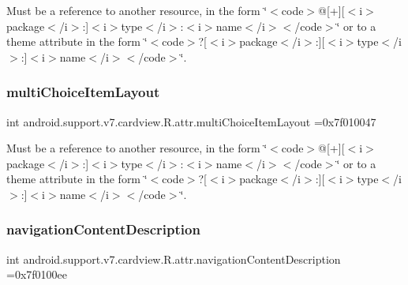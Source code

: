 Must be a reference to another resource, in the form \char`\"{}$<$code$>$@\mbox{[}+\mbox{]}\mbox{[}$<$i$>$package$<$/i$>$\+:\mbox{]}$<$i$>$type$<$/i$>$\+:$<$i$>$name$<$/i$>$$<$/code$>$\char`\"{} or to a theme attribute in the form \char`\"{}$<$code$>$?\mbox{[}$<$i$>$package$<$/i$>$\+:\mbox{]}\mbox{[}$<$i$>$type$<$/i$>$\+:\mbox{]}$<$i$>$name$<$/i$>$$<$/code$>$\char`\"{}. \mbox{\label{classandroid_1_1support_1_1v7_1_1cardview_1_1R_1_1attr_ae83893129928ab526e6828c21bea9dff}} 
\subsubsection{\texorpdfstring{multi\+Choice\+Item\+Layout}{multiChoiceItemLayout}}
{\footnotesize\ttfamily int android.\+support.\+v7.\+cardview.\+R.\+attr.\+multi\+Choice\+Item\+Layout =0x7f010047\hspace{0.3cm}{\ttfamily [static]}}

Must be a reference to another resource, in the form \char`\"{}$<$code$>$@\mbox{[}+\mbox{]}\mbox{[}$<$i$>$package$<$/i$>$\+:\mbox{]}$<$i$>$type$<$/i$>$\+:$<$i$>$name$<$/i$>$$<$/code$>$\char`\"{} or to a theme attribute in the form \char`\"{}$<$code$>$?\mbox{[}$<$i$>$package$<$/i$>$\+:\mbox{]}\mbox{[}$<$i$>$type$<$/i$>$\+:\mbox{]}$<$i$>$name$<$/i$>$$<$/code$>$\char`\"{}. \mbox{\label{classandroid_1_1support_1_1v7_1_1cardview_1_1R_1_1attr_af2cce7ed6eca186ae590d5969dfdb847}} 
\subsubsection{\texorpdfstring{navigation\+Content\+Description}{navigationContentDescription}}
{\footnotesize\ttfamily int android.\+support.\+v7.\+cardview.\+R.\+attr.\+navigation\+Content\+Description =0x7f0100ee\hspace{0.3cm}{\ttfamily [static]}}

